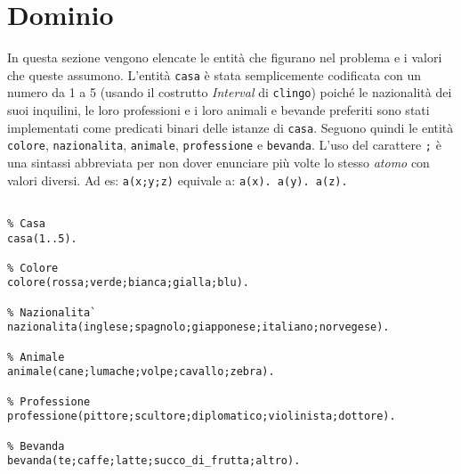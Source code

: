 \section{Dominio}
In questa sezione vengono elencate le entità che figurano nel problema e i valori che queste assumono.
L'entità \texttt{casa} è stata semplicemente codificata con un numero da 1 a 5 (usando il costrutto \emph{Interval} di \texttt{clingo}) poiché le nazionalità dei suoi inquilini, le loro professioni e i loro animali e bevande preferiti sono stati implementati come predicati binari delle istanze di \texttt{casa}. Seguono quindi le entità \texttt{colore}, \texttt{nazionalita}, \texttt{animale}, \texttt{professione} e \texttt{bevanda}. L'uso del carattere \texttt{;} è una sintassi abbreviata per non dover enunciare più volte lo stesso \emph{atomo} con valori diversi. Ad es: \texttt{a(x;y;z)} equivale a: \texttt{a(x). a(y). a(z).}
\clearpage{}
\begin{lstlisting}[frame=tb]
%% Dominio

% Casa
casa(1..5).

% Colore
colore(rossa;verde;bianca;gialla;blu).

% Nazionalita`
nazionalita(inglese;spagnolo;giapponese;italiano;norvegese).

% Animale
animale(cane;lumache;volpe;cavallo;zebra).

% Professione
professione(pittore;scultore;diplomatico;violinista;dottore).

% Bevanda
bevanda(te;caffe;latte;succo_di_frutta;altro).
\end{lstlisting}
